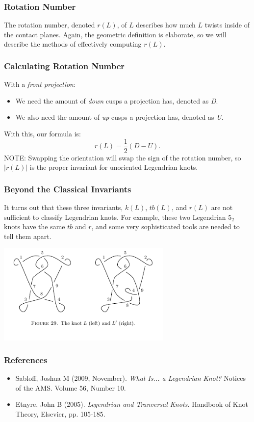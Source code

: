 \documentclass{beamer}
\begin{document}
\begin{frame}
    \frametitle{Rotation Number}
    The \alert{rotation number}, denoted \alert{$r(L)$}, of $L$ describes how
    much $L$ twists inside of the contact planes.
    Again, the geometric definition is elaborate, so we will describe the
    methods of effectively computing $r(L)$.
\end{frame}


\begin{frame}
    \frametitle{Calculating Rotation Number}
    With a \textit{front projection}:
    \begin{itemize}
        \item{We need the amount of \textit{down} cusps a projection has, denoted
        as \textit{D}.}
      \item{We also need the amount of \textit{up} cusps a projection has,
      denoted as \textit{U}.}
    \end{itemize}
    With this, our formula is:
    \[r(L) = \frac{1}{2}(D - U).\]
    \alert{NOTE}: Swapping the orientation will swap the sign of the rotation number,
    so $|r(L)|$ is the proper invariant for unoriented Legendrian knots.
\end{frame}

\begin{frame}
    \frametitle{Beyond the Classical Invariants}
    It turns out that these three invariants, $k(L)$, $tb(L)$, and $r(L)$
    are not sufficient to classify Legendrian knots. For example, these
    two Legendrian $5_2$ knots have the same $tb$ and $r$, and some very
    sophisticated tools are needed to tell them apart.

    \begin{center}
    \includegraphics[height=5cm]{diffKnots.jpg}
    \end{center}
\end{frame}
\begin{frame}
    \frametitle{References}
    \begin{itemize}
        \item Sabloff, Joshua M (2009, November). \textit{What Is... a Legendrian Knot?}
        Notices of the AMS. Volume 56, Number 10.
    \end{itemize}
    \begin{itemize}
        \item Etnyre, John B (2005). \textit{Legendrian and Tranversal Knots.}
        Handbook of Knot Theory, Elsevier, pp. 105-185.
    \end{itemize}

\end{frame}
\end{document}
